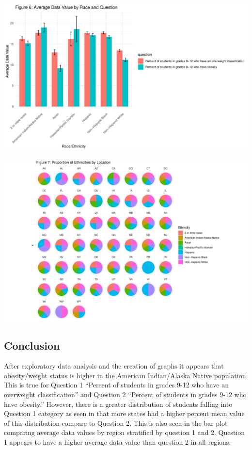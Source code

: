 \documentclass[
  letterpaper,
  DIV=11,
  numbers=noendperiod]{scrartcl}
\begin{document}
\includegraphics{PM566---Final_files/figure-pdf/unnamed-chunk-28-1.pdf}

\includegraphics{PM566---Final_files/figure-pdf/unnamed-chunk-31-1.pdf}

\subsection{Conclusion}\label{conclusion}

After exploratory data analysis and the creation of graphs it appears
that obesity/weight status is higher in the American Indian/Alaska
Native population. This is true for Question 1 ``Percent of students in
grades 9-12 who have an overweight classification'' and Question 2
``Percent of students in grades 9-12 who have obesity.'' However, there
is a greater distribution of students falling into Question 1 category
as seen in that more states had a higher percent mean value of this
distribution compare to Question 2. This is also seen in the bar plot
comparing average data values by region stratified by question 1 and 2.
Question 1 appears to have a higher average data value than question 2
in all regions.
\end{document}
